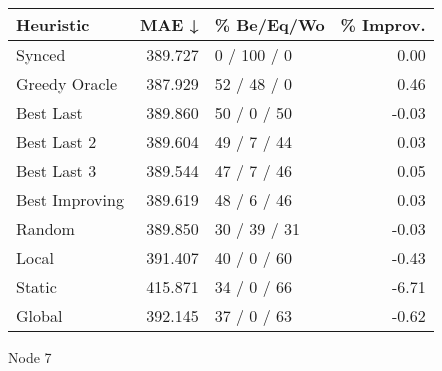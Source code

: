 \begin{tabular}{lrlr}
\toprule
\textbf{Heuristic} & \textbf{MAE ↓} & \textbf{\% Be/Eq/Wo} & \textbf{\% Improv.} \\
\midrule
            Synced &        389.727 &          0 / 100 / 0 &                0.00 \\
     Greedy Oracle &        387.929 &          52 / 48 / 0 &                0.46 \\
         Best Last &        389.860 &          50 / 0 / 50 &               -0.03 \\
       Best Last 2 &        389.604 &          49 / 7 / 44 &                0.03 \\
       Best Last 3 &        389.544 &          47 / 7 / 46 &                0.05 \\
    Best Improving &        389.619 &          48 / 6 / 46 &                0.03 \\
            Random &        389.850 &         30 / 39 / 31 &               -0.03 \\
             Local &        391.407 &          40 / 0 / 60 &               -0.43 \\
            Static &        415.871 &          34 / 0 / 66 &               -6.71 \\
            Global &        392.145 &          37 / 0 / 63 &               -0.62 \\
\bottomrule
\end{tabular}
\caption{Node 7}
\label{tab:iid_lr01_le2_bs2_7}
